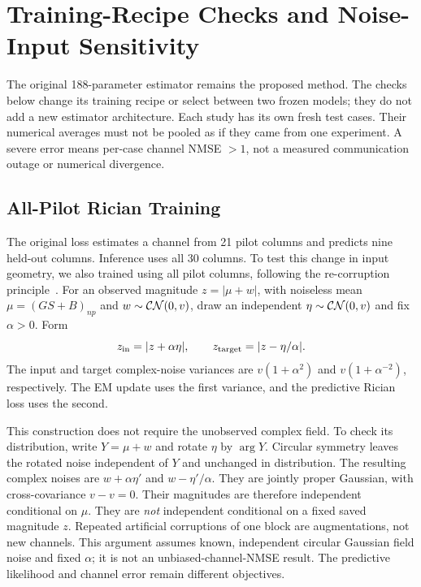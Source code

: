 \section{Training-Recipe Checks and Noise-Input Sensitivity}
\label{sec:training-updates}

The original 188-parameter estimator remains the proposed method. The
checks below change its training recipe or select between two frozen
models; they do not add a new estimator architecture. Each study has its
own fresh test cases. Their numerical averages must not be pooled as if
they came from one experiment. A severe error means per-case channel
NMSE $>1$, not a measured communication outage or numerical divergence.

\subsection{All-Pilot Rician Training}

The original loss estimates a channel from 21 pilot columns and predicts
nine held-out columns. Inference uses all 30 columns. To test this change
in input geometry, we also trained using all pilot columns, following
the re-corruption principle~\cite{pang2021r2r}. For an observed magnitude
$z=|\mu+w|$, with noiseless mean $\mu=(GS+B)_{np}$ and
$w\sim\mathcal{CN}(0,v)$, draw an independent
$\eta\sim\mathcal{CN}(0,v)$ and fix $\alpha>0$. Form
\begin{equation}
 z_{\rm in}=|z+\alpha\eta|,\qquad
 z_{\rm target}=|z-\eta/\alpha|.
\end{equation}
The input and target complex-noise variances are
$v(1+\alpha^2)$ and $v(1+\alpha^{-2})$, respectively. The EM update uses
the first variance, and the predictive Rician loss uses the second.

This construction does not require the unobserved complex field. To
check its distribution, write $Y=\mu+w$ and rotate $\eta$ by $\arg Y$.
Circular symmetry leaves the rotated noise independent of $Y$ and
unchanged in distribution. The resulting complex noises are
$w+\alpha\eta'$ and $w-\eta'/\alpha$. They are jointly proper Gaussian,
with cross-covariance $v-v=0$. Their magnitudes are therefore independent
conditional on $\mu$. They are \emph{not} independent conditional on a
fixed saved magnitude $z$. Repeated artificial corruptions of one block
are augmentations, not new channels. This argument assumes known,
independent circular Gaussian field noise and fixed $\alpha$; it is not
an unbiased-channel-NMSE result. The predictive likelihood and channel
error remain different objectives.

